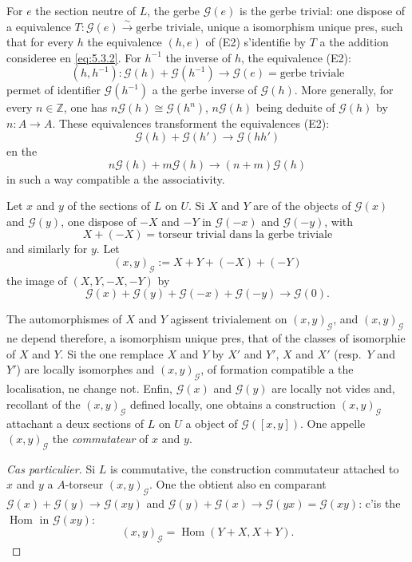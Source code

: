 \documentclass[12pt,a4paper]{article}
\theoremstyle{plain}
\theoremstyle{definition}
\theoremstyle{remark}
\DeclareMathOperator{\Hom}{Hom}
\newcommand{\Z}{\mathbb{Z}}
\providecommand{\Hom}{\operatorname{Hom}}
\begin{document}
For $e$ the section neutre of $L$, the gerbe $\mathscr{G}(e)$ is the gerbe trivial: one dispose of a
equivalence $T : \mathscr{G}(e) \xrightarrow{\sim} \text{gerbe triviale}$, unique a isomorphism unique pres, such that
for every $h$ the equivalence $(h, e)$ of (E2) s'identifie by $T$ a the addition consideree en \eqref{eq:5.3.2}.
For $h^{-1}$ the inverse of $h$, the equivalence (E2):
\[
(h, h^{-1}) : \mathscr{G}(h) + \mathscr{G}(h^{-1}) \to \mathscr{G}(e) = \text{gerbe triviale}
\]
permet of identifier $\mathscr{G}(h^{-1})$ a the gerbe inverse of $\mathscr{G}(h)$. More generally, for every
$n \in \Z$, one has $n\mathscr{G}(h) \cong \mathscr{G}(h^n)$, $n\mathscr{G}(h)$ being deduite of $\mathscr{G}(h)$ by $n : A \to A$. These equivalences
transforment the equivalences (E2):
\[
\mathscr{G}(h) + \mathscr{G}(h') \to \mathscr{G}(hh')
\]
en the
\[
n\mathscr{G}(h) + m\mathscr{G}(h) \to (n + m)\mathscr{G}(h)
\]
in such a way compatible a the associativity.

Let $x$ and $y$ of the sections of $L$ on $U$. Si $X$ and $Y$ are of the objects of $\mathscr{G}(x)$ and $\mathscr{G}(y)$,
one dispose of $-X$ and $-Y$ in $\mathscr{G}(-x)$ and $\mathscr{G}(-y)$, with
\[
X + (-X) = \text{torseur trivial dans la gerbe triviale}
\]
and similarly for $y$. Let
\[
(x,y)_\mathscr{G} := X + Y + (-X) + (-Y)
\]
the image of $(X, Y, -X, -Y)$ by
\[
\mathscr{G}(x) + \mathscr{G}(y) + \mathscr{G}(-x) + \mathscr{G}(-y) \to \mathscr{G}(0).
\]

The automorphismes of $X$ and $Y$ agissent trivialement on $(x,y)_\mathscr{G}$, and $(x,y)_\mathscr{G}$ ne depend
therefore, a isomorphism unique pres, that of the classes of isomorphie of $X$ and $Y$. Si the one remplace $X$ and $Y$ by $X'$ and $Y'$, $X$ and $X'$ (resp.~$Y$ and $Y'$) are locally isomorphes and $(x,y)_\mathscr{G}$,
of formation compatible a the localisation, ne change not. Enfin, $\mathscr{G}(x)$ and $\mathscr{G}(y)$ are
locally not vides and, recollant of the $(x,y)_\mathscr{G}$ defined locally, one obtains a construction $(x, y)_\mathscr{G}$ attachant a deux sections of $L$ on $U$ a object of $\mathscr{G}([x,y])$. One appelle
$(x,y)_\mathscr{G}$ the \emph{commutateur} of $x$ and $y$.

\begin{proof}[Cas particulier]
Si $L$ is commutative, the construction commutateur attached to $x$
and $y$ a $A$-torseur $(x,y)_\mathscr{G}$. One the obtient also en comparant $\mathscr{G}(x) + \mathscr{G}(y) \to \mathscr{G}(xy)$ and
$\mathscr{G}(y) + \mathscr{G}(x) \to \mathscr{G}(yx) = \mathscr{G}(xy)$: c'is the $\Hom$ in $\mathscr{G}(xy)$:
\[
(x,y)_\mathscr{G} = \Hom(Y + X, X + Y).
\]
\end{proof}
\end{document}

